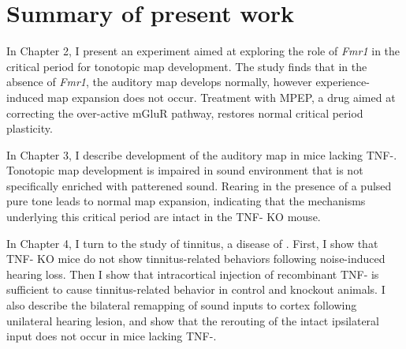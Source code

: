 \section{Summary of present work}

In Chapter 2, I present an experiment aimed at exploring the role of \textit{Fmr1} in the critical period for tonotopic map development. The study finds that in the absence of \textit{Fmr1}, the auditory map develops normally, however experience-induced map expansion does not occur. Treatment with MPEP, a drug aimed at correcting the over-active mGluR pathway, restores normal critical period plasticity.

In Chapter 3, I describe development of the auditory map in mice lacking TNF-\textalpha{}. Tonotopic map development is impaired in sound environment that is not specifically enriched with patterened sound. Rearing in the presence of a pulsed pure tone leads to normal map expansion, indicating that the mechanisms underlying this critical period are intact in the TNF-\textalpha{} KO mouse.

In Chapter 4, I turn to the study of tinnitus, a disease of . First, I show that TNF-\textalpha{} KO mice do not show tinnitus-related behaviors following noise-induced hearing loss. Then I show that intracortical injection of recombinant TNF-\textalpha{} is sufficient to cause tinnitus-related behavior in control and knockout animals. I also describe the bilateral remapping of sound inputs to cortex following unilateral hearing lesion, and show that the rerouting of the intact ipsilateral input does not occur in mice lacking TNF-\textalpha{}.